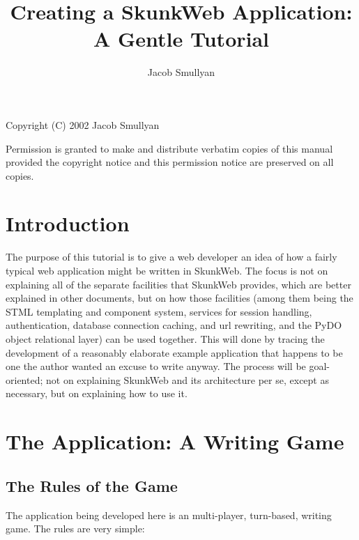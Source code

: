\documentclass{manual}
\title{Creating a SkunkWeb Application: A Gentle Tutorial}
\author{Jacob Smullyan}
\begin{document}
\maketitle

\vfill 

\noindent
Copyright (C) 2002 Jacob Smullyan

\noindent
Permission is granted to make and distribute verbatim copies of this
manual provided the copyright notice and this permission notice are
preserved on all copies.

\tableofcontents

\chapter{Introduction}
\label{introduction}

The purpose of this tutorial is to give a web developer an idea of how
a fairly typical web application might be written in SkunkWeb. The
focus is not on explaining all of the separate facilities that
SkunkWeb provides, which are better explained in other documents, but
on how those facilities (among them being the STML templating and
component system, services for session handling, authentication,
database connection caching, and url rewriting, and the PyDO object
relational layer) can be used together.  This will done by tracing the
development of a reasonably elaborate example application that happens
to be one the author wanted an excuse to write anyway.  The process
will be goal-oriented; not on explaining SkunkWeb and its architecture
per se, except as necessary, but on explaining how to use it. 

\chapter{The Application: A Writing Game}
\label{application}

\section{The Rules of the Game}

The application being developed here is an multi-player, turn-based,
writing game.  The rules are very simple:
\end{document}
